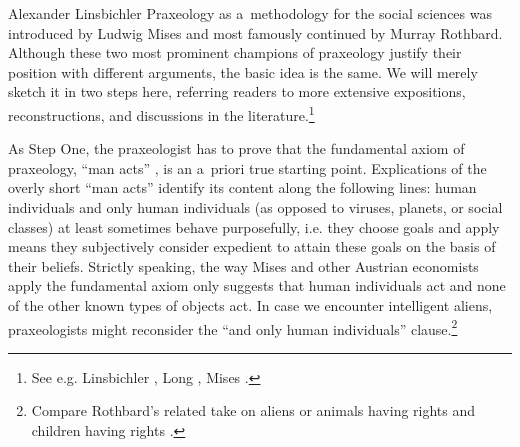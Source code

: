 \begin{artengenv}{Alexander Linsbichler}
Praxeology as a~methodology for the social sciences was introduced by Ludwig Mises and most famously continued by Murray Rothbard. Although these two most prominent champions of praxeology justify their position with different arguments, the basic idea is the same. We will merely sketch it in two steps here, referring readers to more extensive expositions, reconstructions, and discussions in the literature.\footnote{See e.g. Linsbichler 
\parencites*[][]{linsbichler_was_2017}[][]{linsbichler_austrian_2021}, %
 Long 
\parencite*[][]{long_wittgenstein_2008}, %
 Mises 
\parencites*[][]{mises_nationalokonomie_1940}[][]{mises_epistemological_2003}[][]{mises_theory_2007}[][]{mises_ultimate_1962}[][]{mises_ultimate_2012}.%
}



As Step One, the praxeologist has to prove that the fundamental axiom of praxeology, ``man acts'' 
\parencite[see, e.g.][p.4]{mises_ultimate_2012}, %
 is an a~priori true starting point. Explications of the overly short ``man acts'' identify its content along the following lines: human individuals and only human individuals (as opposed to viruses, planets, or social classes) at least sometimes behave purposefully, i.e. they choose goals and apply means they subjectively consider expedient to attain these goals on the basis of their beliefs. Strictly speaking, the way Mises and other Austrian economists apply the fundamental axiom only suggests that human individuals act and none of the other known types of objects act. In case we encounter intelligent aliens, praxeologists might reconsider the ``and only human individuals'' clause.\footnote{Compare Rothbard's related take on aliens or animals having rights 
\parencite[][pp.155–157]{rothbard_ethics_1998} %
 and children having rights 
\parencite[][pp.97–112]{rothbard_ethics_1998}.%
}




\end{artengenv}
